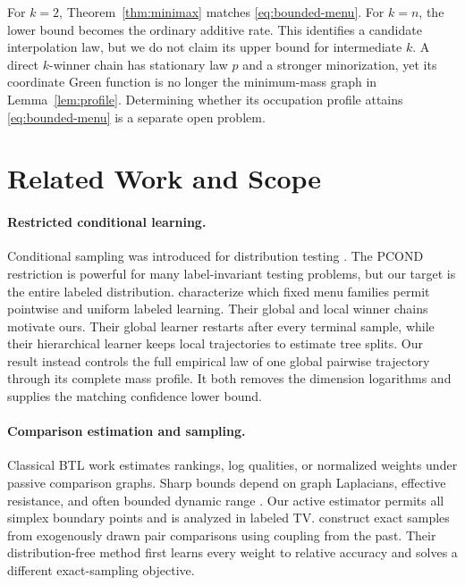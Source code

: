 \documentclass[twoside]{article}
\begin{document}
For $k=2$, Theorem~\ref{thm:minimax} matches \eqref{eq:bounded-menu}. For $k=n$, the lower bound becomes the ordinary additive rate. This identifies a candidate interpolation law, but we do not claim its upper bound for intermediate $k$. A direct $k$-winner chain has stationary law $p$ and a stronger minorization, yet its coordinate Green function is no longer the minimum-mass graph in Lemma~\ref{lem:profile}. Determining whether its occupation profile attains \eqref{eq:bounded-menu} is a separate open problem.

\section{Related Work and Scope}
\label{sec:related}

\paragraph{Restricted conditional learning.}
Conditional sampling was introduced for distribution testing \citep{canonne2015testing,chakraborty2016power}. The PCOND restriction is powerful for many label-invariant testing problems, but our target is the entire labeled distribution. \citet{kleinberg2026providers} characterize which fixed menu families permit pointwise and uniform labeled learning. Their global and local winner chains motivate ours. Their global learner restarts after every terminal sample, while their hierarchical learner keeps local trajectories to estimate tree splits. Our result instead controls the full empirical law of one global pairwise trajectory through its complete mass profile. It both removes the dimension logarithms and supplies the matching confidence lower bound.

\paragraph{Comparison estimation and sampling.}
Classical BTL work estimates rankings, log qualities, or normalized weights under passive comparison graphs. Sharp bounds depend on graph Laplacians, effective resistance, and often bounded dynamic range \citep{shah2015estimation,negahban2017rank, agarwal2018accelerated,hendrickx2019resistance,hendrickx2020minimax}. Our active estimator permits all simplex boundary points and is analyzed in labeled TV. \citet{fotakis2022perfect} construct exact samples from exogenously drawn pair comparisons using coupling from the past. Their distribution-free method first learns every weight to relative accuracy and solves a different exact-sampling objective.
\end{document}
